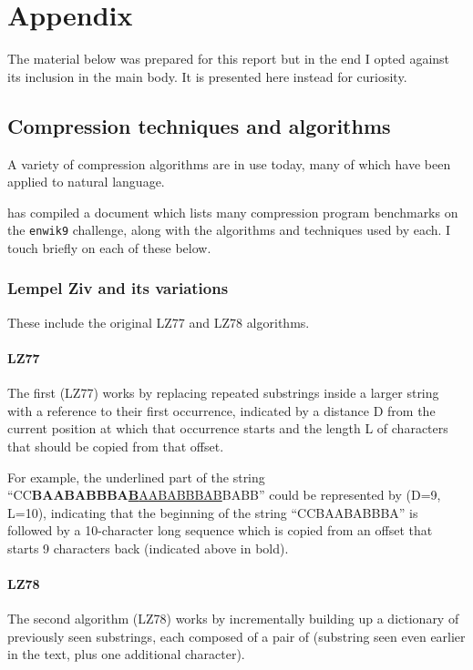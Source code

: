 \chapter{Appendix}

The material below was prepared for this report but in the end I opted against its inclusion in the main body. It is presented here instead for curiosity.

\section*{Compression techniques and algorithms}

A variety of compression algorithms are in use today, many of which have been applied to natural language.

\textcite{Mahoney2011} has compiled a document which lists many compression program benchmarks on the \texttt{enwik9} challenge, along with the algorithms and techniques used by each. I touch briefly on each of these below.

\subsection*{Lempel Ziv and its variations}
These include the original LZ77 \autocite{Ziv1977} and LZ78 \autocite{Ziv1978} algorithms.

\subsubsection*{LZ77}

The first (LZ77) works by replacing repeated substrings inside a larger string with a reference to their first occurrence, indicated by a distance D from the current position at which that occurrence starts and the length L of characters that should be copied from that offset.

For example, the underlined part of the string “CC\textbf{BAABABBBA\underline{B}}\underline{AABABBBAB}BABB” could be represented by (D=9, L=10), indicating that the beginning of the string “CCBAABABBBA” is followed by a 10-character long sequence which is copied from an offset that starts 9 characters back (indicated above in bold).

\subsubsection*{LZ78}

The second algorithm (LZ78) works by incrementally building up a dictionary of previously seen substrings, each composed of a pair of (substring seen even earlier in the text, plus one additional character).

